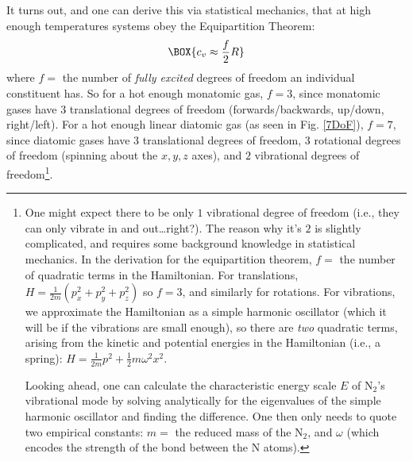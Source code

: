 It turns out, and one can derive this via statistical mechanics, that at high enough temperatures systems obey the Equipartition Theorem:
\begin{align}
    \BOX{c_v\approx\frac{f}{2}R}
\end{align}
where $f=$ the number of \textit{fully excited} degrees of freedom an individual constituent has. So for a hot enough monatomic gas, $f=3$, since monatomic gases have $3$ translational degrees of freedom (forwards/backwards, up/down, right/left). For a hot enough linear diatomic gas (as seen in Fig. \ref{7DoF}), $f=7$, since diatomic gases have $3$ translational degrees of freedom, $3$ rotational degrees of freedom (spinning about the $x,y,z$ axes), and $2$ vibrational degrees of freedom\footnote{
    One might expect there to be only $1$ vibrational degree of freedom (i.e., they can only vibrate in and out\ldots right?). The reason why it's $2$ is slightly complicated, and requires some background knowledge in statistical mechanics. In the derivation for the equipartition theorem, $f= $ the number of quadratic terms in the Hamiltonian. For translations, $H=\frac{1}{2m}\left(p_x^2+p_y^2+p_z^2\right)$ so $f=3$, and similarly for rotations. For vibrations, we approximate the Hamiltonian as a simple harmonic oscillator (which it will be if the vibrations are small enough), so there are \textit{two} quadratic terms, arising from the kinetic and potential energies in the Hamiltonian (i.e., a spring): $H=\frac{1}{2m}p^2+\frac{1}{2}m\omega^2x^2$.

    Looking ahead, one can calculate the characteristic energy scale $E$ of N$_2$'s vibrational mode by solving analytically for the eigenvalues of the simple harmonic oscillator and finding the difference. One then only needs to quote two empirical constants: $m=$ the reduced mass of the N$_2$, and $\omega$ (which encodes the strength of the bond between the N atoms). 
}.

